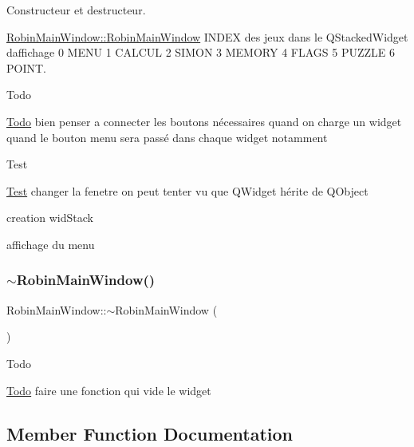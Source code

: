Constructeur et destructeur. 

\hyperlink{class_robin_main_window_a55f7775f5daefb2099a51e97d50df666}{Robin\+Main\+Window\+::\+Robin\+Main\+Window} I\+N\+D\+EX des jeux dans le Q\+Stacked\+Widget d\textquotesingle{}affichage 0 M\+E\+NU 1 C\+A\+L\+C\+UL 2 S\+I\+M\+ON 3 M\+E\+M\+O\+RY 4 F\+L\+A\+GS 5 P\+U\+Z\+Z\+LE 6 P\+O\+I\+NT.

\begin{DoxyRefDesc}{Todo}
\item[\hyperlink{todo__todo000021}{Todo}]bien penser a connecter les boutons nécessaires quand on charge un widget quand le bouton menu sera passé dans chaque widget notamment \end{DoxyRefDesc}
\begin{DoxyRefDesc}{Test}
\item[\hyperlink{test__test000003}{Test}]changer la fenetre on peut tenter vu que Q\+Widget hérite de Q\+Object \end{DoxyRefDesc}


creation wid\+Stack

affichage du menu \mbox{\label{class_robin_main_window_a72eb8450efc1dfe22e2f36c7f728c5f3}} 
\subsubsection{\texorpdfstring{$\sim$\+Robin\+Main\+Window()}{~RobinMainWindow()}}
{\footnotesize\ttfamily Robin\+Main\+Window\+::$\sim$\+Robin\+Main\+Window (\begin{DoxyParamCaption}{ }\end{DoxyParamCaption})}

\begin{DoxyRefDesc}{Todo}
\item[\hyperlink{todo__todo000022}{Todo}]faire une fonction qui vide le widget \end{DoxyRefDesc}


\subsection{Member Function Documentation}
\mbox{\label{class_robin_main_window_a0850e17ae24394b14eb2dcfc4f15eeca}} 

